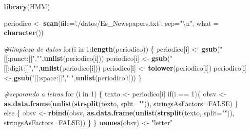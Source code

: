 \documentclass[]{article}
\newenvironment{Shaded}{\begin{snugshade}}{\end{snugshade}}
\newcommand{\KeywordTok}[1]{\textcolor[rgb]{0.13,0.29,0.53}{\textbf{{#1}}}}
\newcommand{\DataTypeTok}[1]{\textcolor[rgb]{0.13,0.29,0.53}{{#1}}}
\newcommand{\DecValTok}[1]{\textcolor[rgb]{0.00,0.00,0.81}{{#1}}}
\newcommand{\CharTok}[1]{\textcolor[rgb]{0.31,0.60,0.02}{{#1}}}
\newcommand{\StringTok}[1]{\textcolor[rgb]{0.31,0.60,0.02}{{#1}}}
\newcommand{\CommentTok}[1]{\textcolor[rgb]{0.56,0.35,0.01}{\textit{{#1}}}}
\newcommand{\OtherTok}[1]{\textcolor[rgb]{0.56,0.35,0.01}{{#1}}}
\newcommand{\NormalTok}[1]{{#1}}
\begin{document}
\begin{Shaded}
\begin{Highlighting}[]
\KeywordTok{library}\NormalTok{(HMM)}

\NormalTok{periodico <-}\StringTok{ }\KeywordTok{scan}\NormalTok{(}\DataTypeTok{file=}\StringTok{'./datos/Es_Newspapers.txt'}\NormalTok{, }\DataTypeTok{sep=}\StringTok{"}\CharTok{\textbackslash{}n}\StringTok{"}\NormalTok{, }\DataTypeTok{what =} \KeywordTok{character}\NormalTok{())}

\CommentTok{#limpieza de datos}
\NormalTok{for(i in }\DecValTok{1}\NormalTok{:}\KeywordTok{length}\NormalTok{(periodico)) \{}
  \NormalTok{periodico[i] <-}\StringTok{ }\KeywordTok{gsub}\NormalTok{(}\StringTok{"[[:punct:]]"}\NormalTok{,}\StringTok{""}\NormalTok{,}\KeywordTok{unlist}\NormalTok{(periodico[i]))}
  \NormalTok{periodico[i] <-}\StringTok{ }\KeywordTok{gsub}\NormalTok{(}\StringTok{"[[:digit:]]"}\NormalTok{,}\StringTok{""}\NormalTok{,}\KeywordTok{unlist}\NormalTok{(periodico[i]))}
  \NormalTok{periodico[i] <-}\StringTok{ }\KeywordTok{tolower}\NormalTok{(periodico[i])}
  \NormalTok{periodico[i] <-}\StringTok{ }\KeywordTok{gsub}\NormalTok{(}\StringTok{"[[:space:]]"}\NormalTok{,}\StringTok{" "}\NormalTok{,}\KeywordTok{unlist}\NormalTok{(periodico[i]))}
\NormalTok{\}}


\CommentTok{#separando a letras}
\NormalTok{for (i in }\DecValTok{1}\NormalTok{) \{}
  \NormalTok{texto <-}\StringTok{ }\NormalTok{periodico[i]}
  \NormalTok{if(i ==}\StringTok{ }\DecValTok{1}\NormalTok{)\{}
    \NormalTok{obsv <-}\StringTok{ }\KeywordTok{as.data.frame}\NormalTok{(}\KeywordTok{unlist}\NormalTok{(}\KeywordTok{strsplit}\NormalTok{(texto, }\DataTypeTok{split=}\StringTok{""}\NormalTok{)), }\DataTypeTok{stringsAsFactors=}\OtherTok{FALSE}\NormalTok{)}
  \NormalTok{\} else \{}
    \NormalTok{obsv <-}\StringTok{ }\KeywordTok{rbind}\NormalTok{(obsv, }\KeywordTok{as.data.frame}\NormalTok{(}\KeywordTok{unlist}\NormalTok{(}\KeywordTok{strsplit}\NormalTok{(texto, }\DataTypeTok{split=}\StringTok{""}\NormalTok{)), }\DataTypeTok{stringsAsFactors=}\OtherTok{FALSE}\NormalTok{))}
  \NormalTok{\}}
\NormalTok{\}}
\KeywordTok{names}\NormalTok{(obsv) <-}\StringTok{ "letter"}



\end{Highlighting}
\end{Shaded}
\end{document}

